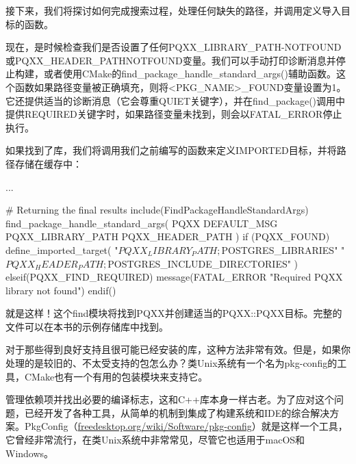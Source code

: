 
接下来，我们将探讨如何完成搜索过程，处理任何缺失的路径，并调用定义导入目标的函数。


现在，是时候检查我们是否设置了任何PQXX\_LIBRARY\_PATH-NOTFOUND或PQXX\_HEADER\_PATHNOTFOUND变量。我们可以手动打印诊断消息并停止构建，或者使用CMake的find\_package\_handle\_standard\_args()辅助函数。这个函数如果路径变量被正确填充，则将<PKG\_NAME>\_FOUND变量设置为1。它还提供适当的诊断消息（它会尊重QUIET关键字），并在find\_package()调用中提供REQUIRED关键字时，如果路径变量未找到，则会以FATAL\_ERROR停止执行。

如果找到了库，我们将调用我们之前编写的函数来定义IMPORTED目标，并将路径存储在缓存中：


\begin{cmake}
...

# Returning the final results
include(FindPackageHandleStandardArgs)
find_package_handle_standard_args(
    PQXX DEFAULT_MSG PQXX_LIBRARY_PATH PQXX_HEADER_PATH
)
if (PQXX_FOUND)
    define_imported_target(
        "${PQXX_LIBRARY_PATH};${POSTGRES_LIBRARIES}"
        "${PQXX_HEADER_PATH};${POSTGRES_INCLUDE_DIRECTORIES}"
    )
elseif(PQXX_FIND_REQUIRED)
    message(FATAL_ERROR "Required PQXX library not found")
endif()
\end{cmake}

就是这样！这个find模块将找到PQXX并创建适当的PQXX::PQXX目标。完整的文件可以在本书的示例存储库中找到。

对于那些得到良好支持且很可能已经安装的库，这种方法非常有效。但是，如果你处理的是较旧的、不太受支持的包怎么办？类Unix系统有一个名为pkg-config的工具，CMake也有一个有用的包装模块来支持它。


管理依赖项并找出必要的编译标志，这和C++库本身一样古老。为了应对这个问题，已经开发了各种工具，从简单的机制到集成了构建系统和IDE的综合解决方案。PkgConfig（\url{freedesktop.org/wiki/Software/pkg-config}）就是这样一个工具，它曾经非常流行，在类Unix系统中非常常见，尽管它也适用于macOS和Windows。

